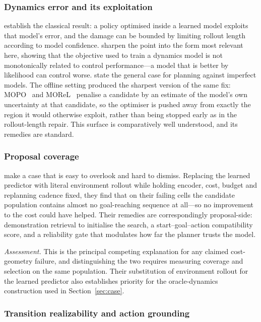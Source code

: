\documentclass[11pt,letterpaper]{article}
\begin{document}
\subsubsection{Dynamics error and its exploitation}

\citet{janner2019trust} establish the classical result: a policy optimised
inside a learned model exploits that model's error, and the damage can be bounded
by limiting rollout length according to model confidence.
\citet{lambert2020objective} sharpen the point into the form most relevant here,
showing that the objective used to train a dynamics model is not monotonically
related to control performance---a model that is better by likelihood can control
worse. \citet{bhamidipaty2026imperfect} state the general case for planning
against imperfect models. The offline setting produced the sharpest version of
the same fix: MOPO~\citep{yu2020mopo} and MOReL~\citep{kidambi2020morel}
penalise a candidate by an estimate of the model's own uncertainty at that
candidate, so the optimiser is pushed away from exactly the region it would
otherwise exploit, rather than being stopped early as in the rollout-length
repair. This surface is comparatively well understood, and its remedies are
standard.

\subsubsection{Proposal coverage}

\citet{imwm2026} make a case that is easy to overlook and hard to dismiss.
Replacing the learned predictor with literal environment rollout while holding
encoder, cost, budget and replanning cadence fixed, they find that on their
failing cells the candidate population contains almost no goal-reaching sequence
at all---so no improvement to the cost could have helped. Their remedies are
correspondingly proposal-side: demonstration retrieval to initialise the search,
a start--goal--action compatibility score, and a reliability gate that modulates
how far the planner trusts the model.

\emph{Assessment.} This is the principal competing explanation for any claimed
cost-geometry failure, and distinguishing the two requires measuring coverage
and selection on the same population. Their substitution of environment rollout
for the learned predictor also establishes priority for the oracle-dynamics
construction used in Section~\ref{sec:case}.

\subsubsection{Transition realizability and action grounding}\label{sec:lit-diag-action}
\end{document}
